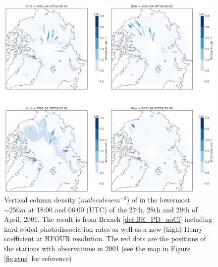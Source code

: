 \begin{figure}[h]
    \centering
    \includegraphics[width=\linewidth]{Chapter6_Results/images/Polar_StationComp_2001/BrO/polarBrO_HTWO_step3.png}
    \caption{Vertical column density ($molecules cm^{-2}$) of  in the lowermost $\sim 250 m$ at 18:00 and 06:00 (UTC) of the 27th, 28th and 29th of April, 2001. The result is from  Branch \ref{def:BE_PD_noCl} including hard-coded photodissociation rates as well as a new (high) Henry-coefficient at HFOUR resolution. The red dots are the positions of the stations with observations in 2001 (see the map in Figure \ref{fig:stns} for reference)}
    \label{fig:polarBrO_HTWO_step3}
\end{figure}